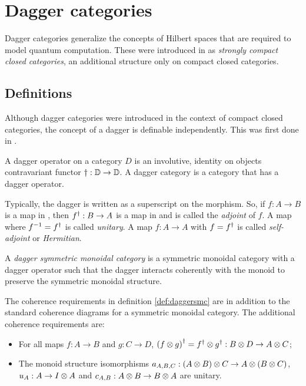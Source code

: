 \section{Dagger categories}\label{sec:daggercategories}
Dagger categories generalize the concepts of Hilbert spaces that are required to model quantum
computation. These were introduced in \cite{abramsky04:catsemquantprot} as \emph{strongly compact
closed categories}, an additional structure only on compact closed categories.


\subsection{Definitions}\label{sec:daggerdefinitions}

Although dagger categories were introduced in the context of compact closed categories, the concept
of a dagger is definable independently. This was first done in \cite{selinger05:dagger}.

\begin{definition}\label{def:daggercat}
  A dagger operator on a category $D$ is an involutive, identity on objects
  contravariant functor $\dagger:\mathbb{D}\to \mathbb{D}$. A dagger category
  is a category that has a dagger operator.
\end{definition}

Typically, the dagger is written as a superscript on the morphism. So, if $f:A\to B$ is a map in
\cD, then ${f}^{\dagger}:B\to A$ is a map in \cD{} and is called the \emph{adjoint} of $f$. A map where
$f^{-1} = {f}^{\dagger}$ is called \emph{unitary}. A map $f:A\to A$ with $f={f}^{\dagger}$ is called
\emph{self-adjoint} or \emph{Hermitian}.

\begin{definition}\label{def:daggersmc}
  A \emph{dagger symmetric monoidal category} is a symmetric monoidal category \cD{} with a dagger
  operator such that the dagger interacts coherently with the monoid to preserve the symmetric
  monoidal structure.
\end{definition}

The coherence requirements in definition \ref{def:daggersmc} are in addition to the standard
coherence diagrams for a symmetric monoidal category. The additional coherence requirements are:
\begin{itemize}
  \item For all maps $f:A\to B$ and $g:C\to D$, ${(f\otimes g)}^{\dagger} = {f}^{\dagger}\otimes{g}^{\dagger}:B\otimes D \to A\otimes C$;
  \item The monoid structure isomorphisms $a_{A,B,C}:(A\otimes B)\otimes C\to A\otimes(B\otimes C)$, $u_{A}:A\to I\otimes A$ and
    $c_{A,B}:A\otimes B \to B\otimes A$ are unitary.
\end{itemize}

